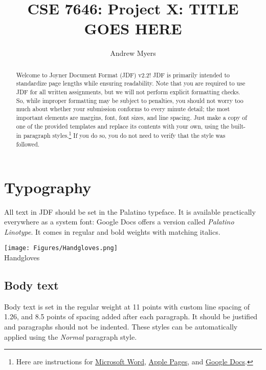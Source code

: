 \documentclass[
	letterpaper, %
]{jdf}
\author{Andrew Myers}
\title{CSE 7646: Project X: TITLE GOES HERE}
\begin{document}

\maketitle

\begin{abstract}
	Welcome to Joyner Document Format (JDF) v2.2! JDF is primarily intended to standardize page lengths while ensuring readability. 
	Note that you are required to use JDF for all written assignments, but we will not perform explicit formatting checks. 
	So, while improper formatting may be subject to penalties, you should not worry too much about whether your submission conforms to 
	every minute detail; the most important elements are margins, font, font sizes, and line spacing. Just make a copy of one of the provided templates 
	and replace its contents with your own, using the built-in paragraph styles.\footnote{Here are instructions for 
	\href{https://support.office.com/en-us/article/Video-Using-Styles-in-Word-9db4c0f4-2754-4294-9758-c14a0abd8cfa}{Microsoft Word}, 
	\href{https://support.apple.com/guide/pages/intro-to-paragraph-styles-tanaa39b0aa3/mac}{Apple Pages}, and 
	\href{https://www.bazroberts.com/2016/04/19/google-docs-paragraph-styles-headings/}{Google Docs}.} If you do so, you do not need to verify that the style was followed.
\end{abstract}

\section{Typography}
All text in JDF should be set in the Palatino typeface. It is available practically everywhere as a system font: Google Docs offers a version 
called \emph{Palatino Linotype}. It comes in regular and bold weights with matching italics.

\begin{jdffigure}
\texttt{[image: Figures/Handgloves.png]} \\
{\huge Handgloves}%
\label{fig:Palatino}%
\end{jdffigure}

\subsection{Body text}
Body text is set in the regular weight at 11 points with custom line spacing of 1.26, and 8.5 points of spacing added after each paragraph. It should be justified 
and paragraphs should not be indented. These styles can be automatically applied using the \emph{Normal} paragraph style.
\end{document}
